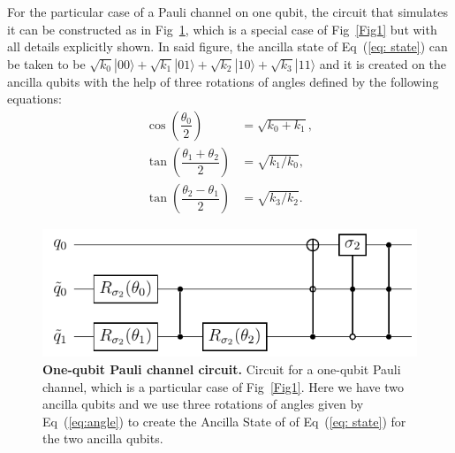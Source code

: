 \documentclass[10pt,letterpaper]{article} %
\newcommand{\fref}[1]{Fig~\ref{#1}}
\newcommand{\eref}[1]{Eq~(\ref{#1})}
\begin{document}
For the particular case of a Pauli channel on one qubit, the circuit that
simulates it can be constructed as in \fref{Fig2},
which is a special case of \fref{Fig1}
but with all details  explicitly shown.
In said figure, the ancilla state
of \eref{eq: state} can be taken to be
$\sqrt{k_{0}} |00\rangle + \sqrt{k_{1}} |01\rangle + \sqrt{k_{2}} 
|10\rangle + \sqrt{k_{3}}|11\rangle$
and it is created on the ancilla qubits with the help of three rotations of angles
defined by the following equations:
\begin{align}
\label{eq:angle}
\cos\left(\dfrac{\theta_0}{2} \right) &= \sqrt{k_{0} + k_{1}},\nonumber \\
\tan\left( \dfrac{\theta_1 + \theta_2}{2} \right) &= \sqrt{k_{1}/k_{0}},  \\
\tan\left( \dfrac{\theta_2 - \theta_1}{2} \right) &= \sqrt{k_{3}/k_{2}}.  \nonumber
\end{align}

\begin{figure} %
\centering
\includegraphics{circuito_unqubit.pdf}
\caption{
{\bf One-qubit Pauli channel circuit.} Circuit for a one-qubit Pauli channel,
which is a particular case of \fref{Fig1}.  Here we have two
ancilla qubits and we use three rotations
of angles given by \eref{eq:angle} to create the Ancilla State of
of \eref{eq: state} for the two ancilla qubits.
}
\label{Fig2} 
\end{figure} %


\end{document}
